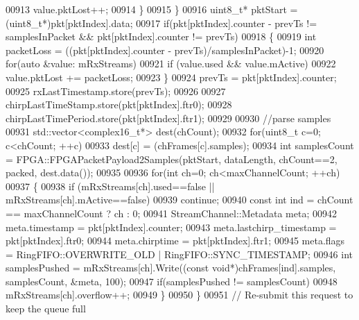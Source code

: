\begin{DoxyCode}
{{00913                             value.pktLost++;
00914                 \}
00915             \}
00916             uint8\_t* pktStart = (uint8\_t*)pkt[pktIndex].data;
00917             \textcolor{keywordflow}{if}(pkt[pktIndex].counter - prevTs != samplesInPacket && pkt[pktIndex].counter != prevTs)
00918             \{
00919                 \textcolor{keywordtype}{int} packetLoss = ((pkt[pktIndex].counter - prevTs)/samplesInPacket)-1;
00920                 \textcolor{keywordflow}{for}(\textcolor{keyword}{auto} &value: mRxStreams)
00921                     \textcolor{keywordflow}{if} (value.used && value.mActive)
00922                         value.pktLost += packetLoss;
00923             \}
00924             prevTs = pkt[pktIndex].counter;
00925             rxLastTimestamp.store(prevTs);
00926 
00927             chirpLastTimeStamp.store(pkt[pktIndex].ftr0);
00928             chirpLastTimePeriod.store(pkt[pktIndex].ftr1);
00929 
00930             \textcolor{comment}{//parse samples}
00931             std::vector<complex16\_t*> dest(chCount);
00932             \textcolor{keywordflow}{for}(uint8\_t c=0; c<chCount; ++c)
00933                 dest[c] = (chFrames[c].samples);
00934             \textcolor{keywordtype}{int} samplesCount = FPGA::FPGAPacketPayload2Samples(pktStart, 
      dataLength, chCount==2, packed, dest.data());
00935 
00936             \textcolor{keywordflow}{for}(\textcolor{keywordtype}{int} ch=0; ch<maxChannelCount; ++ch)
00937             \{
00938                 \textcolor{keywordflow}{if} (mRxStreams[ch].used==\textcolor{keyword}{false} || mRxStreams[ch].mActive==\textcolor{keyword}{false})
00939                     \textcolor{keywordflow}{continue};
00940                 \textcolor{keyword}{const} \textcolor{keywordtype}{int} ind = chCount == maxChannelCount ? ch : 0;
00941                 StreamChannel::Metadata meta;
00942                 meta.timestamp = pkt[pktIndex].counter;
00943                 meta.lastchirp_timestamp = pkt[pktIndex].ftr0;
00944                 meta.chirptime = pkt[pktIndex].ftr1;
00945                 meta.flags = RingFIFO::OVERWRITE_OLD | RingFIFO::SYNC_TIMESTAMP;
00946                 \textcolor{keywordtype}{int} samplesPushed = mRxStreams[ch].Write((\textcolor{keyword}{const} \textcolor{keywordtype}{void}*)chFrames[ind].samples, samplesCount, 
      &meta, 100);
00947                 \textcolor{keywordflow}{if}(samplesPushed != samplesCount)
00948                     mRxStreams[ch].overflow++;
00949             \}
00950         \}
00951         \textcolor{comment}{// Re-submit this request to keep the queue full}
}}
\end{DoxyCode}
